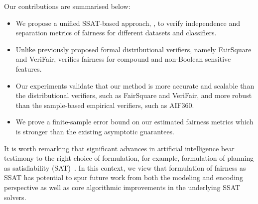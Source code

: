 Our contributions are summarised below:
\begin{itemize}
	\item We propose a unified SSAT-based approach, {\justicia}, to verify independence and separation metrics of fairness for different datasets and classifiers.
	\item Unlike previously proposed formal distributional verifiers, namely FairSquare and VeriFair, {\justicia} verifies fairness for compound and non-Boolean sensitive features.%
	\item Our experiments validate that our method is more accurate and scalable than the distributional verifiers, such as FairSquare and VeriFair, and more robust than the sample-based empirical verifiers, such as AIF360.
	\item We prove a finite-sample error bound on our estimated fairness metrics which is stronger than the existing asymptotic guarantees.
\end{itemize}

It is worth remarking that significant advances in artificial intelligence bear testimony to the right choice of formulation, for example, formulation of planning as satisfiability (SAT)~\cite{kautz1992planning}. In this context, we view that formulation of fairness as SSAT has potential to spur future work from both the modeling and encoding perspective as well as core algorithmic improvements in the underlying SSAT solvers.  

